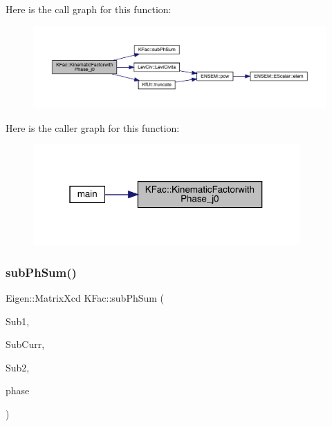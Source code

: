 Here is the call graph for this function\+:
\nopagebreak
\begin{figure}[H]
\begin{center}
\leavevmode
\includegraphics[width=350pt]{d2/d89/namespaceKFac_a87a5304db9d4c659637da23e363cf4a4_cgraph}
\end{center}
\end{figure}
Here is the caller graph for this function\+:
\nopagebreak
\begin{figure}[H]
\begin{center}
\leavevmode
\includegraphics[width=289pt]{d2/d89/namespaceKFac_a87a5304db9d4c659637da23e363cf4a4_icgraph}
\end{center}
\end{figure}
\mbox{\label{namespaceKFac_a87e82af0cfc26fdde23953fb315dc9d5}} 
\subsubsection{\texorpdfstring{subPhSum()}{subPhSum()}\hspace{0.1cm}{\footnotesize\ttfamily [1/2]}}
{\footnotesize\ttfamily Eigen\+::\+Matrix\+Xcd K\+Fac\+::sub\+Ph\+Sum (\begin{DoxyParamCaption}\item[{map$<$ int, Eigen\+::\+Matrix\+Xcd $>$ \&}]{Sub1,  }\item[{Eigen\+::\+Matrix\+Xcd \&}]{Sub\+Curr,  }\item[{map$<$ int, Eigen\+::\+Matrix\+Xcd $>$ \&}]{Sub2,  }\item[{\mbox{\hyperlink{structPh_1_1phChars}{Ph\+::ph\+Chars}} \&}]{phase }\end{DoxyParamCaption})}

